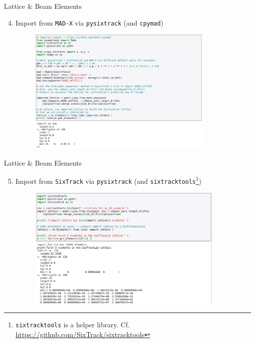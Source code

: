 \documentclass{beamer}
\begin{document}
\begin{frame}{Lattice \& Beam Elements}
\begin{enumerate}
    \setcounter{enumi}{3}
    \item Import from \texttt{MAD-X} via \texttt{pysixtrack} (and \texttt{cpymad})
    \begin{figure}[h]
        \includegraphics[width=0.85\textwidth]{images/pysixtrack_madx_01.png}
    \end{figure}
\end{enumerate}
\end{frame}

\begin{frame}{Lattice \& Beam Elements}
\begin{enumerate}
    \setcounter{enumi}{4}
    \item Import from \texttt{SixTrack} via \texttt{pysixtrack} (and \texttt{sixtracktools}\footnote{\texttt{sixtracktools} is a helper library. Cf. \url{https://github.com/SixTrack/sixtracktools}})
    \begin{figure}[h]
        \includegraphics[width=0.9\textwidth]{images/pysixtrack_sixtrack_01.png}
    \end{figure}
\end{enumerate}
\end{frame}
\end{document}
